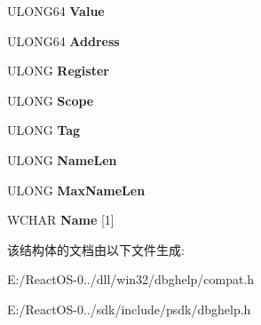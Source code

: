 \begin{DoxyCompactItemize}
U\+L\+O\+N\+G64 {\bfseries Value}
\item 
\mbox{\label{struct___s_y_m_b_o_l___i_n_f_o_w_a0eb2b1e1e4e8d707c083cee4df3cd5f4}} 
U\+L\+O\+N\+G64 {\bfseries Address}
\item 
\mbox{\label{struct___s_y_m_b_o_l___i_n_f_o_w_a23294fcf43fafdfb1e630cc0356e9fd9}} 
U\+L\+O\+NG {\bfseries Register}
\item 
\mbox{\label{struct___s_y_m_b_o_l___i_n_f_o_w_a091e3c1115e445435b4ea50646bde12a}} 
U\+L\+O\+NG {\bfseries Scope}
\item 
\mbox{\label{struct___s_y_m_b_o_l___i_n_f_o_w_acd4fe2747115514bf2085a36c94e848e}} 
U\+L\+O\+NG {\bfseries Tag}
\item 
\mbox{\label{struct___s_y_m_b_o_l___i_n_f_o_w_a8d426843aa1aa71f1487a37149f387de}} 
U\+L\+O\+NG {\bfseries Name\+Len}
\item 
\mbox{\label{struct___s_y_m_b_o_l___i_n_f_o_w_afe0ba69e6fc5b26993d3eec2c948bc7d}} 
U\+L\+O\+NG {\bfseries Max\+Name\+Len}
\item 
\mbox{\label{struct___s_y_m_b_o_l___i_n_f_o_w_aae63019a3195745a4fc3a0e090d10d95}} 
W\+C\+H\+AR {\bfseries Name} \mbox{[}1\mbox{]}
\end{DoxyCompactItemize}


该结构体的文档由以下文件生成\+:\begin{DoxyCompactItemize}
\item 
E\+:/\+React\+O\+S-\/0../dll/win32/dbghelp/compat.\+h\item 
E\+:/\+React\+O\+S-\/0../sdk/include/psdk/dbghelp.\+h\end{DoxyCompactItemize}
